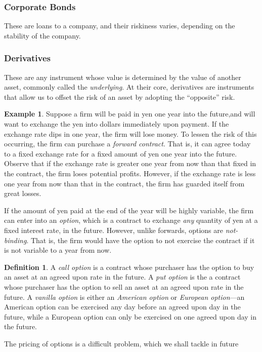 \documentclass[12pt]{article}
\theoremstyle{plain}
\theoremstyle{definition}
\newtheorem*{definition}{Definition}
\newtheorem*{example}{Example}
\theoremstyle{remark}
\numberwithin{equation}{section}  %
\begin{document}
\subsubsection{Corporate Bonds}
These are loans to a company, and their riskiness varies, depending on the 
stability of the company. 
\subsubsection{Derivatives}
These are any instrument whose value is determined by the value of another 
asset, commonly called the \emph{underlying}. At their core, derivatives are 
instruments that allow us to offset the risk of an asset by adopting the 
``opposite'' risk.
\begin{example}
	Suppose a firm will be paid in yen one year into the future,and will want 
	to exchange the yen into dollars immediately upon payment.
	If the exchange rate dips in one year, the firm will lose money. To lessen 
	the risk of this occurring, the firm can purchase a \emph{forward 
		contract}. That is, it can agree today to a fixed exchange rate for a fixed 
	amount of yen one year into the future. Observe that if the exchange rate 
	is greater one year from now than that fixed in the contract, the firm 
	loses potential profits. However, if the exchange rate is less one year 
	from now than that in the contract, the firm has guarded itself from great 
	losses. 
\end{example}
If the amount of yen paid at the end of the year will be highly variable, the 
firm can enter into an \emph{option}, which is a contract to exchange 
\emph{any} quantity of yen at a fixed interest rate, in the future. However, 
unlike forwards, options are \emph{not-binding}. That is, the firm would have 
the option to not exercise the contract if it is not variable to a year from 
now.
\begin{definition}
	A \emph{call option} is a contract whose purchaser has the option to buy an 
	asset at an agreed upon rate in the future. A \emph{put option} is the a 
	contract whose purchaser has the option to sell an asset at an agreed upon 
	rate in the future. A \emph{vanilla option} is either an \emph{American 
		option} or \emph{European option}---an American option can be exercised any 
	day before an agreed upon day in the future, while a European option can 
	only be exercised on one agreed upon day in the future.
\end{definition}
The pricing of options is a difficult problem, which we shall tackle in future 
\end{document}
